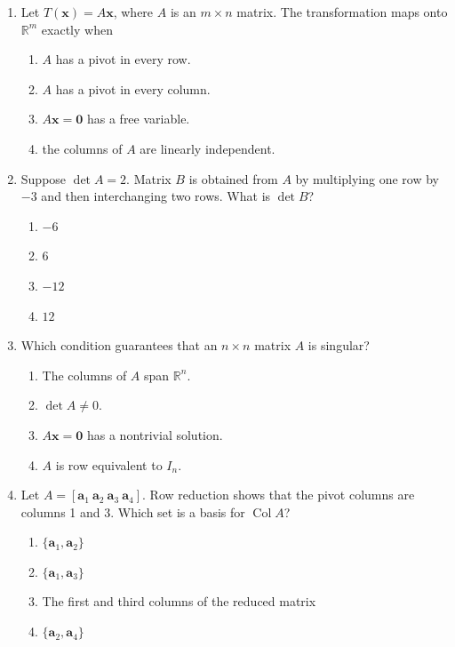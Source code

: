 \documentclass[11pt]{article}
\newif\ifshowsolutions
\newcommand{\R}{\mathbb{R}}
\newcommand{\vect}[1]{\mathbf{#1}}
\newcommand{\Col}{\operatorname{Col}}
\newcommand{\solution}[1]{%
  \ifshowsolutions
    \par\medskip
    {\color{solutionblue}\textbf{Solution.} #1}
    \par\medskip
  \fi}
\begin{document}
\begin{enumerate}
\item Let $T(\vect x)=A\vect x$, where $A$ is an $m\times n$ matrix. The transformation maps onto $\R^m$ exactly when
\begin{enumerate}[label=\Alph*.]
  \item $A$ has a pivot in every row.
  \item $A$ has a pivot in every column.
  \item $A\vect x=\vect0$ has a free variable.
  \item the columns of $A$ are linearly independent.
\end{enumerate}
\solution{\textbf{A.} A pivot in every row makes $A\vect x=\vect b$ consistent for every $\vect b\in\R^m$.}

\item Suppose $\det A=2$. Matrix $B$ is obtained from $A$ by multiplying one row by $-3$ and then interchanging two rows. What is $\det B$?
\begin{enumerate}[label=\Alph*.]
  \item $-6$
  \item $6$
  \item $-12$
  \item $12$
\end{enumerate}
\solution{\textbf{B.} The scale contributes $-3$ and the interchange contributes $-1$, so $\det B=(-3)(-1)(2)=6$.}

\item Which condition guarantees that an $n\times n$ matrix $A$ is singular?
\begin{enumerate}[label=\Alph*.]
  \item The columns of $A$ span $\R^n$.
  \item $\det A\ne0$.
  \item $A\vect x=\vect0$ has a nontrivial solution.
  \item $A$ is row equivalent to $I_n$.
\end{enumerate}
\solution{\textbf{C.} A nontrivial null-space vector means the columns are dependent and $A$ is singular.}

\item Let $A=[\vect a_1\ \vect a_2\ \vect a_3\ \vect a_4]$. Row reduction shows that the pivot columns are columns 1 and 3. Which set is a basis for $\Col A$?
\begin{enumerate}[label=\Alph*.]
  \item $\{\vect a_1,\vect a_2\}$
  \item $\{\vect a_1,\vect a_3\}$
  \item The first and third columns of the reduced matrix
  \item $\{\vect a_2,\vect a_4\}$
\end{enumerate}
\solution{\textbf{B.} Use the corresponding pivot columns from the original matrix.}


\end{enumerate}
\end{document}
